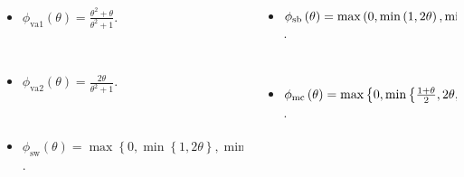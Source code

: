 \begin{frame}
\begin{examples}
\begin{columns}
\begin{column}{.48\paperwidth}
\begin{itemize}
					      \

					\item

					      \begin{math}
						      \phi_{\text{va1}}
						      \left(\theta\right)=
						      \frac{\theta^{2}+\theta}{\theta^{2}+1}
					      \end{math}.

					      \

					\item

					      \begin{math}
						      \phi_{\text{va2}}
						      \left(\theta\right)=
						      \frac{2\theta}{\theta^{2}+1}
					      \end{math}.

					      \

					\item

					      \begin{math}
						      \phi_{\text{sw}}
						      \left(\theta\right)=
						      \max
						      \left\{
						      0,
						      \min
						      \left\{1,2\theta\right\},
						      \min
						      \left\{2,\theta\right\}
						      \right\}
					      \end{math}.
				\end{itemize}
			\end{column}
			\begin{column}{.48\paperwidth}
				\begin{itemize}
					\item

					      \begin{math}
						      \phi_{\text{\text{sb}}}
						      \left(\theta\right)=
						      \max
						      \left(
						      0,
						      \min\left(1,2\theta\right),
						      \min\left(2,\theta\right)
						      \right)
					      \end{math}.

					      \

					\item

					      \begin{math}
						      \phi_{\text{\text{mc}}}
						      \left(\theta\right)=
						      \max
						      \left\{
						      0,
						      \min
						      \left\{
						      \frac{1+\theta}{2},2\theta,2
						      \right\}
						      \right\}
					      \end{math}.


\end{itemize}
\end{column}
\end{columns}
\end{examples}
\end{frame}
